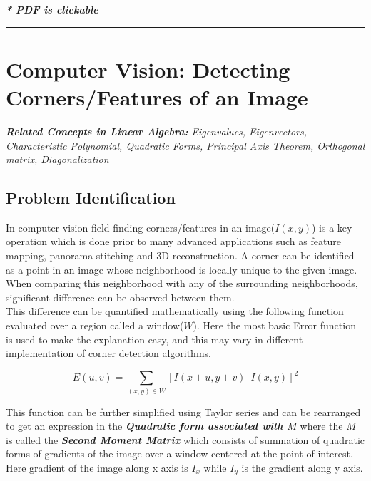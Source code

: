 \documentclass[a4paper,11pt]{article}%
\begin{document}

\tableofcontents

\begin{center}
	\textbf{\textit{* PDF is clickable}}
\end{center}
\vspace{1cm}
\hrule




\section{Computer Vision: Detecting Corners/Features of an Image}

\textit{\large \textbf{Related Concepts in Linear Algebra:} Eigenvalues, Eigenvectors, Characteristic Polynomial, Quadratic Forms, Principal Axis Theorem, Orthogonal matrix, Diagonalization}

\subsection{Problem Identification}

In computer vision field finding corners/features in an image($I(x, y)$) is a key operation which is done prior to many advanced applications such as feature mapping, panorama stitching and 3D reconstruction. A corner can be identified as a point in an image whose neighborhood is locally unique to the given image. When comparing this neighborhood with any of the surrounding neighborhoods, significant difference can be observed between them.\\

This difference can be quantified mathematically using the following function evaluated over a region called a window($W$). Here the most basic Error function is used to make the explanation easy, and this may vary in different implementation of corner detection algorithms.

\begin{equation}
	E(u,v) = \sum_{(x,y) \in W}[I(x+u, y+v) – I(x, y)]^2
\end{equation}

This function can be further simplified using Taylor series and can be rearranged to get an expression in the \textbf{\textit{Quadratic form associated with $M$}} where the $M$ is called the \textit{\textbf{Second Moment Matrix}} which consists of summation of quadratic forms of gradients of the image over a window centered at the point of interest. Here gradient of the image along x axis is $I_{x}$ while $I_{y}$ is the gradient along y axis.
\end{document}
